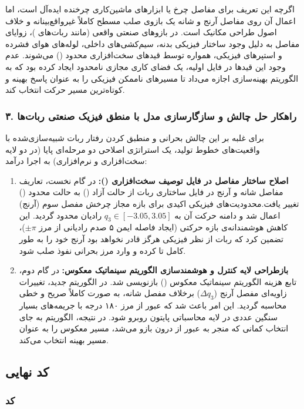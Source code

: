 \documentclass{article}
\begin{document}
اگرچه این تعریف برای مفاصل چرخ یا ابزارهای ماشین‌کاری چرخنده ایده‌آل است، اما اعمال آن روی مفاصل آرنج و شانه یک بازوی صلب مسطح کاملاً غیرواقع‌بینانه و خلاف اصول طراحی مکانیک است. در بازوهای صنعتی واقعی (مانند ربات‌های )، زوایای مفاصل به دلیل وجود ساختار فیزیکی بدنه، سیم‌کشی‌های داخلی، لوله‌های هوای فشرده و استپرهای فیزیکی، همواره توسط قیدهای سخت‌افزاری محدود () می‌شوند. عدم وجود این قیدها در فایل  اولیه، یک فضای کاری مجازی نامحدود ایجاد کرده بود که به الگوریتم بهینه‌سازی اجازه می‌داد تا مسیرهای ناممکن فیزیکی را به عنوان پاسخ بهینه و کوتاه‌ترین مسیر حرکت انتخاب کند.

\subsubsection*{۳. راهکار حل چالش و سازگارسازی مدل با منطق فیزیک صنعتی ربات‌ها}

برای غلبه بر این چالش بحرانی و منطبق کردن رفتار ربات شبیه‌سازی‌شده با واقعیت‌های خطوط تولید، یک استراتژی اصلاحی دو مرحله‌ای پایا (در دو لایه سخت‌افزاری و نرم‌افزاری) به اجرا درآمد:

\begin{enumerate}
	\item \textbf{اصلاح ساختار مفاصل در فایل توصیف سخت‌افزاری ():} 
	در گام نخست، تعاریف مفاصل شانه و آرنج در فایل ساختاری ربات از حالت آزاد () به حالت محدود () تغییر یافت.محدودیت‌های فیزیکی اکیدی برای بازه مجاز چرخش مفصل سوم (آرنج) اعمال شد و دامنه حرکت آن به $q_3 \in [-3.05, 3.05]$ رادیان محدود گردید. این کاهش هوشمندانه‌ی بازه حرکتی (ایجاد فاصله ایمن ۵ صدم رادیانی از مرز $\pm\pi$)، تضمین کرد که ربات از نظر فیزیکی هرگز قادر نخواهد بود آرنج خود را به طور کامل تا کرده و وارد مرز بحرانی نفوذ صلب شود.
	
	\item \textbf{بازطراحی لایه کنترل و هوشمندسازی الگوریتم سینماتیک معکوس:}
	در گام دوم، تابع هزینه الگوریتم سینماتیک معکوس () بازنویسی شد. در الگوریتم جدید، تغییرات زاویه‌ای مفصل آرنج ($\Delta q_3$) برخلاف مفصل شانه، به صورت کاملاً صریح و خطی محاسبه گردید. این امر باعث شد که عبور از مرز ۱۸۰ درجه با جریمه‌های بسیار سنگین عددی در لایه محاسباتی پایتون روبرو شود. در نتیجه، الگوریتم به جای انتخاب کمانی که منجر به عبور از درون بازو می‌شد، مسیر معکوس را به عنوان مسیر بهینه انتخاب می‌کند.
\end{enumerate}

\newpage
\subsection{کد نهایی}

\subsubsection{کد}
\begin{LTR}
	\inputminted{python}{code/RC-Hw2-LAB1-SEC_C.py}
\end{LTR}
\end{document}
